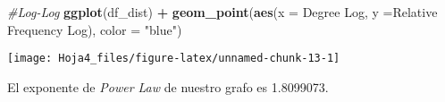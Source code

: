 \documentclass[
]{article}
\newenvironment{Shaded}{\begin{snugshade}}{\end{snugshade}}
\newcommand{\CommentTok}[1]{\textcolor[rgb]{0.56,0.35,0.01}{\textit{#1}}}
\newcommand{\DataTypeTok}[1]{\textcolor[rgb]{0.13,0.29,0.53}{#1}}
\newcommand{\KeywordTok}[1]{\textcolor[rgb]{0.13,0.29,0.53}{\textbf{#1}}}
\newcommand{\NormalTok}[1]{#1}
\newcommand{\OperatorTok}[1]{\textcolor[rgb]{0.81,0.36,0.00}{\textbf{#1}}}
\newcommand{\StringTok}[1]{\textcolor[rgb]{0.31,0.60,0.02}{#1}}
\begin{document}
\begin{Shaded}
\begin{Highlighting}[]
\CommentTok{\#Log{-}Log}
\KeywordTok{ggplot}\NormalTok{(df\_dist) }\OperatorTok{+}
\StringTok{  }\KeywordTok{geom\_point}\NormalTok{(}\KeywordTok{aes}\NormalTok{(}\DataTypeTok{x =} \StringTok{\textasciigrave{}}\DataTypeTok{Degree Log}\StringTok{\textasciigrave{}}\NormalTok{, }\DataTypeTok{y =}\StringTok{\textasciigrave{}}\DataTypeTok{Relative Frequency Log}\StringTok{\textasciigrave{}}\NormalTok{), }\DataTypeTok{color =} \StringTok{"blue"}\NormalTok{)}
\end{Highlighting}
\end{Shaded}

\begin{center}\texttt{[image: Hoja4\_files/figure-latex/unnamed-chunk-13-1]} \end{center}

\begin{Shaded}
\end{Shaded}

El exponente de \emph{Power Law} de nuestro grafo es 1.8099073.
\end{document}
